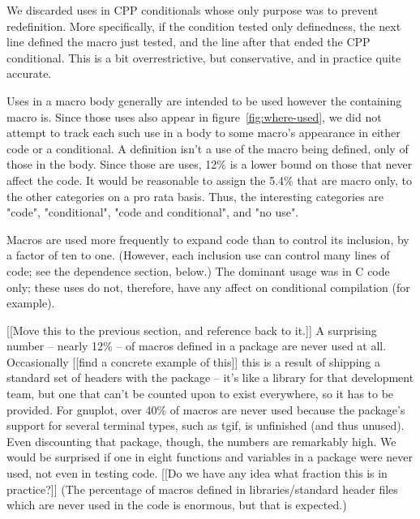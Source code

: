 \documentclass[10pt]{article}
\begin{document}
      We discarded uses in CPP conditionals whose only purpose was to
        prevent redefinition.  More specifically, if the condition tested
        only definedness, the next line defined the macro just tested, and
        the line after that ended the CPP conditional.  This is a bit
        overrestrictive, but conservative, and in practice quite accurate.
        
        Uses in a macro body generally are intended to be used however the
        containing macro is.  Since those uses also appear in
        figure~\ref{fig:where-used}, we did not attempt to track each such
        use in a body to some macro's appearance in either code or a
        conditional.  
        A definition isn't a use of the macro being defined, only of those
        in the body.  Since those are uses, 12\% is a lower bound on those
        that never affect the code.
        It would be reasonable to assign the 5.4\% that are macro only, to
        the other categories on a pro rata basis.
        Thus, the interesting categories are "code",
        "conditional", "code and conditional", and "no use".

      Macros are used more frequently to expand code than to control its
        inclusion, by a factor of ten to one.  (However, each inclusion use
        can control many lines of code; see the dependence section, below.)
The dominant usage was in C code only; these uses
do not, therefore, have any affect on conditional compilation (for example).

[[Move this to the previous section, and reference back to it.]]
      A surprising number -- nearly 12\% -- of macros defined in a package
        are never used at all.  Occasionally [[find a concrete example of
        this]] this is a result of shipping a 
        standard set of headers with the package -- it's like a library for
        that development team, but one that can't be counted upon to exist
        everywhere, so it has to be provided.  For gnuplot, over 40\% of
        macros are never used because the package's support for several
        terminal types, such as tgif, is unfinished (and thus unused).
        Even discounting that package, though, the numbers are remarkably
        high.  We would be surprised if one in eight functions and
        variables in a package were never used, not even in testing code.
        [[Do we have any idea what fraction this is in practice?]]
        (The percentage of macros defined in libraries/standard header
        files which are never used in the code is enormous, but that is
        expected.)
\end{document}
